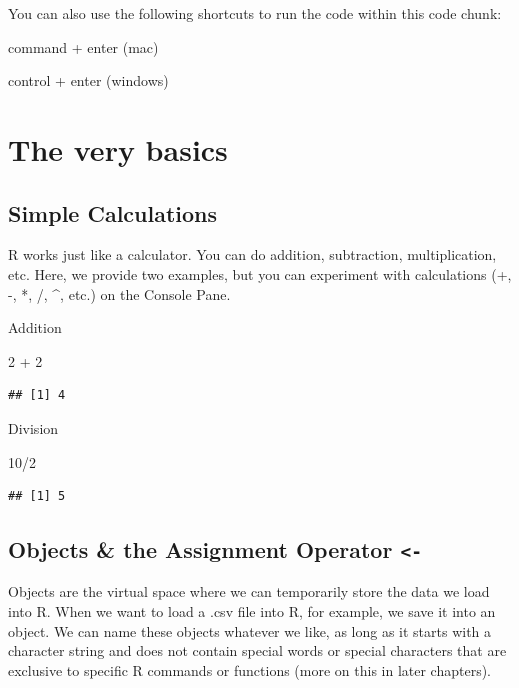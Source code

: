 \documentclass[
]{book}
\newenvironment{Shaded}{\begin{snugshade}}{\end{snugshade}}
\newcommand{\DecValTok}[1]{\textcolor[rgb]{0.00,0.00,0.81}{#1}}
\newcommand{\SpecialCharTok}[1]{\textcolor[rgb]{0.00,0.00,0.00}{#1}}
\begin{document}
You can also use the following shortcuts to run the code within this code chunk:

command + enter (mac)

control + enter (windows)

\hypertarget{the-very-basics}{%
\section{The very basics}\label{the-very-basics}}

\hypertarget{simple-calculations}{%
\subsection{Simple Calculations}\label{simple-calculations}}

R works just like a calculator. You can do addition, subtraction, multiplication, etc. Here, we provide two examples, but you can experiment with calculations (+, -, *, /, \^{}, etc.) on the Console Pane.

Addition

\begin{Shaded}
\begin{Highlighting}[]
\DecValTok{2} \SpecialCharTok{+} \DecValTok{2}
\end{Highlighting}
\end{Shaded}

\begin{verbatim}
## [1] 4
\end{verbatim}

Division

\begin{Shaded}
\begin{Highlighting}[]
\DecValTok{10}\SpecialCharTok{/}\DecValTok{2}
\end{Highlighting}
\end{Shaded}

\begin{verbatim}
## [1] 5
\end{verbatim}

\hypertarget{objects-the-assignment-operator--}{%
\subsection{\texorpdfstring{Objects \& the Assignment Operator \texttt{\textless{}-}}{Objects \& the Assignment Operator \textless-}}\label{objects-the-assignment-operator--}}

Objects are the virtual space where we can temporarily store the data we load into R. When we want to load a .csv file into R, for example, we save it into an object. We can name these objects whatever we like, as long as it starts with a character string and does not contain special words or special characters that are exclusive to specific R commands or functions (more on this in later chapters).
\end{document}
